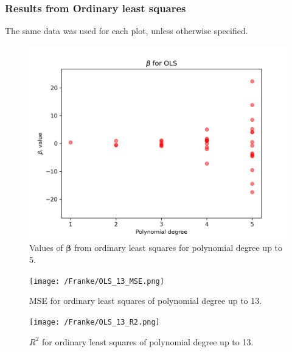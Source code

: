 \documentclass{article}
\begin{document}
\subsubsection{Results from Ordinary least squares}
The same data was used for each plot, unless otherwise specified.
\begin{figure}[htbp]
    \centering
    \includegraphics[width=\textwidth*2/3]{Franke/OLS_5_betas.png}
    \caption{Values of $\boldsymbol{\beta}$ from ordinary least squares for polynomial degree up to 5.}
    \label{fig:OLS5Beta}
\end{figure}

\begin{figure}[htbp]
    \centering
    \texttt{[image: /Franke/OLS\_13\_MSE.png]}
    \caption{MSE for ordinary least squares of polynomial degree up to 13.}
    \label{fig:OLS5MSE}
\end{figure}

\begin{figure}[htbp]
    \centering
    \texttt{[image: /Franke/OLS\_13\_R2.png]}
    \caption{$R^2$ for ordinary least squares of polynomial degree up to 13.}
    \label{fig:OLS5R2}
\end{figure}
\end{document}
